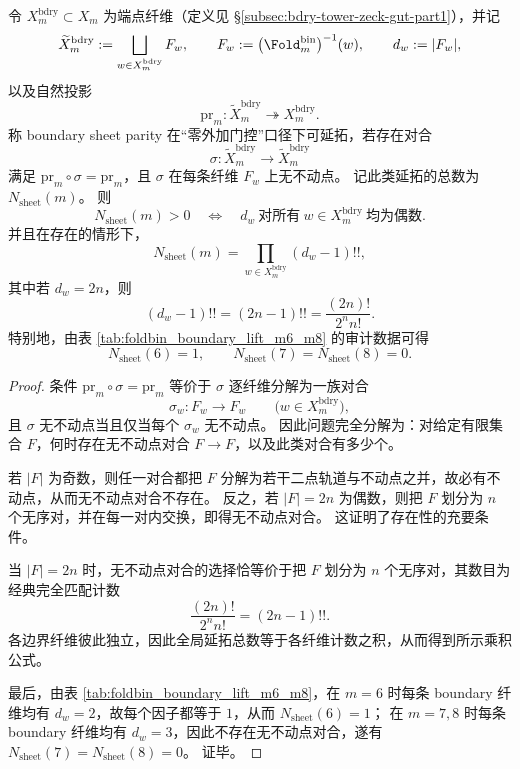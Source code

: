 \begin{theorem}\label{thm:window6-bdry-sheet-parity-nonfunctorial-extension}
令 \(X_m^{\mathrm{bdry}}\subset X_m\) 为端点纤维（定义见 \S\ref{subsec:bdry-tower-zeck-gut-part1}），并记
\[
\widetilde X_m^{\mathrm{bdry}}
:=
\bigsqcup_{w\in X_m^{\mathrm{bdry}}}F_w,
\qquad
F_w:=
\bigl(\Fold^{\mathrm{bin}}_m\bigr)^{-1}(w),
\qquad
d_w:=|F_w|,
\]
以及自然投影
\[
\mathrm{pr}_m:\widetilde X_m^{\mathrm{bdry}}\twoheadrightarrow X_m^{\mathrm{bdry}}.
\]
称 boundary sheet parity 在“零外加门控”口径下可延拓，若存在对合
\[
\sigma:\widetilde X_m^{\mathrm{bdry}}\longrightarrow \widetilde X_m^{\mathrm{bdry}}
\]
满足 \(\mathrm{pr}_m\circ \sigma=\mathrm{pr}_m\)，且 \(\sigma\) 在每条纤维 \(F_w\) 上无不动点。
记此类延拓的总数为 \(N_{\mathrm{sheet}}(m)\)。
则
\[
N_{\mathrm{sheet}}(m)>0
\quad\Longleftrightarrow\quad
d_w\ \text{对所有}\ w\in X_m^{\mathrm{bdry}}\ \text{均为偶数}.
\]
并且在存在的情形下，
\[
N_{\mathrm{sheet}}(m)
=
\prod_{w\in X_m^{\mathrm{bdry}}}(d_w-1)!!,
\]
其中若 \(d_w=2n\)，则
\[
(d_w-1)!!=(2n-1)!!=\frac{(2n)!}{2^n n!}.
\]
特别地，由表 \ref{tab:foldbin_boundary_lift_m6_m8} 的审计数据可得
\[
N_{\mathrm{sheet}}(6)=1,
\qquad
N_{\mathrm{sheet}}(7)=N_{\mathrm{sheet}}(8)=0.
\]
\end{theorem}

\begin{proof}
条件 \(\mathrm{pr}_m\circ \sigma=\mathrm{pr}_m\) 等价于 \(\sigma\) 逐纤维分解为一族对合
\[
\sigma_w:F_w\to F_w
\qquad
\bigl(w\in X_m^{\mathrm{bdry}}\bigr),
\]
且 \(\sigma\) 无不动点当且仅当每个 \(\sigma_w\) 无不动点。
因此问题完全分解为：对给定有限集合 \(F\)，何时存在无不动点对合 \(F\to F\)，以及此类对合有多少个。
\par
若 \(|F|\) 为奇数，则任一对合都把 \(F\) 分解为若干二点轨道与不动点之并，故必有不动点，从而无不动点对合不存在。
反之，若 \(|F|=2n\) 为偶数，则把 \(F\) 划分为 \(n\) 个无序对，并在每一对内交换，即得无不动点对合。
这证明了存在性的充要条件。
\par
当 \(|F|=2n\) 时，无不动点对合的选择恰等价于把 \(F\) 划分为 \(n\) 个无序对，其数目为经典完全匹配计数
\[
\frac{(2n)!}{2^n n!}=(2n-1)!!.
\]
各边界纤维彼此独立，因此全局延拓总数等于各纤维计数之积，从而得到所示乘积公式。
\par
最后，由表 \ref{tab:foldbin_boundary_lift_m6_m8}，在 \(m=6\) 时每条 boundary 纤维均有 \(d_w=2\)，故每个因子都等于 \(1\)，从而 \(N_{\mathrm{sheet}}(6)=1\)；
在 \(m=7,8\) 时每条 boundary 纤维均有 \(d_w=3\)，因此不存在无不动点对合，遂有 \(N_{\mathrm{sheet}}(7)=N_{\mathrm{sheet}}(8)=0\)。
证毕。
\end{proof}

